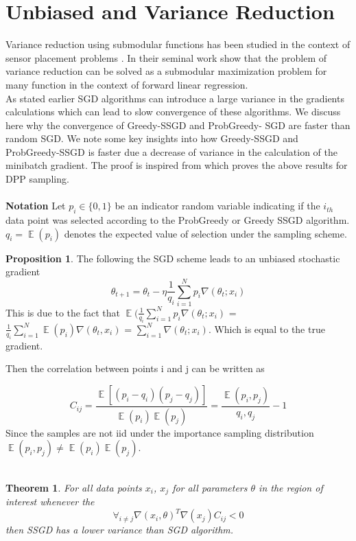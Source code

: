 \documentclass[a4paper,twoside]{iiththesis}
\newtheorem{theorem}{Theorem}
\theoremstyle{definition}
\theoremstyle{definition}
\newtheorem{prop}{Proposition}
\theoremstyle{remark}
\DeclareMathOperator*{\E}{\mathop{\mathbb{E}}}
\begin{document}
\section{Unbiased and Variance Reduction}
Variance reduction using submodular functions has been studied in the context of sensor placement problems \cite{krause2008near}. In their seminal work \cite{das2008algorithms} show that the problem of variance reduction can be solved as a submodular maximization problem for many function in the context of forward linear regression.  \\
As stated earlier SGD algorithms can introduce a large variance in the gradients calculations which can lead to slow convergence of these algorithms.   We discuss here why the convergence of Greedy-SSGD and ProbGreedy-
SGD are faster than random SGD. We note some key insights into how Greedy-SSGD and ProbGreedy-SSGD is faster due a decrease of variance in the calculation of the minibatch gradient.
The proof is inspired from \cite{zhangdiversified} which proves the above results for DPP sampling. \\\\
\textbf{Notation} Let $p_i \in \{0, 1\}$ be an indicator random variable indicating if the $i_{th}$ data point was selected according to the ProbGreedy or Greedy SSGD  algorithm. $q_i = \E(p_i)$ denotes the expected value of selection under the sampling scheme.

\begin{prop}
The following the SGD scheme leads to an unbiased stochastic gradient
\begin{equation}
	\theta_{t+1} = \theta_t - \eta \frac{1}{q_i} \sum_{i=1}^N p_i \nabla (\theta_t; x_i)
\end{equation}
This is due to the fact that $\E(\frac{1}{q_i} \sum_{i=1}^N p_i \nabla(\theta_t; x_i)$ =$\frac{1}{q_i}\sum_{i=1}^N \E(p_i) \nabla(\theta_t, x_i)$ = $\sum_{i=1}^N \nabla(\theta_t; x_i)$. Which is equal to the true gradient.
\end{prop}
\newpage
Then the correlation between points i and j can be written as 

\begin{equation}
	C_{ij} = \frac{\E[(p_i - q_i) (p_j - q_j)]}{\E(p_i)\E(p_j)} = \frac{\E(p_i, p_j)}{q_i, q_j} -1
\end{equation}
Since the samples are not iid under the importance sampling distribution $\E(p_i, p_j) \neq \E(p_i) \E(p_j)$.
\\\\
\begin{theorem}
For all data points $x_i$, $x_j$ for all parameters $\theta$ in the region of interest whenever the 
\begin{equation}
\forall_{i\neq j} \nabla(x_i, \theta)^T \nabla(x_j) C_{ij} < 0
\end{equation}
 then  SSGD has a lower variance than  SGD algorithm.
\end{theorem}
\end{document}
